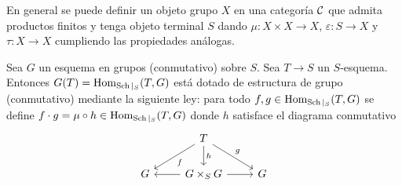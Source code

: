 \documentclass[GA.tex]{subfiles}
\begin{document}
En general se puede definir un objeto grupo $X$ en una categoría $\mathcal{C}$ que admita productos finitos y tenga objeto terminal $S$ dando  $\mu:X\times X\to X$, $\varepsilon:S\to X$ y $\tau:X\to X$ cumpliendo las propiedades análogas. 

\begin{prop}
Sea $G$ un esquema en grupos (conmutativo) sobre $S$. Sea $T\to S$ un $S$-esquema. Entonces $G(T)=\operatorname{Hom}_{\operatorname{Sch}|_S}(T,G)$ está dotado de estructura de grupo (conmutativo) mediante la siguiente ley: para todo $f,g\in\operatorname{Hom}_{\operatorname{Sch}|_S}(T,G)$ se define $f\cdot g=\mu\circ h\in\operatorname{Hom}_{\operatorname{Sch}|_S}(T,G)$ donde $h$ satisface el diagrama conmutativo
\[
\begin{tikzcd}
 & T\arrow[dl, "f"]\arrow[dr, "g"]\arrow[d, "h"] & \\
 G & G\times_S G\arrow[r] \arrow[l] & G
\end{tikzcd}
\]
\end{prop}
\end{document}
